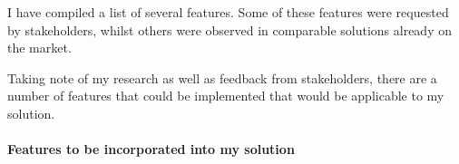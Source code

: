 \documentclass[../../../main.tex]{subfiles}
\begin{document}
\begin{comment}
based on research etc
select the features from the research that will be incorporated
and explain what they do
from sortly, steal x feature because y
include things you won't include as well (out of scope), because xyz
\end{comment}

\noindent I have compiled a list of several features. Some of these features were requested
by stakeholders, whilst others were observed in comparable solutions already
on the market.

\noindent Taking note of my research as well as feedback from stakeholders,
there are a number of features that could be implemented that would be applicable
to my solution.

\paragraph{Features to be incorporated into my solution}
\end{document}

